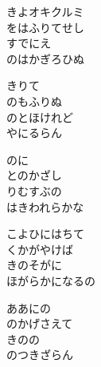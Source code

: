 \documentclass[10pt,b5j]{tarticle} %
\begin{document}
\begin{enumerate}
\begin{minipage}[c]{\blocksize}
        \vspace{\linespace}
        \item
        きよオキクルミ\\
        をはふりてせし\\
        すでにえ\\
        のはかぎろひぬ
        
        \vspace{\linespace}
        \item
        きりて\\
        のもふりぬ\\
        のとほけれど\\
        やにるらん
        
        \vspace{\linespace}
        \item
        のに\\
        とのかざし\\
        りむすぶの\\
        はきわれらかな
        
        \vspace{\linespace}
        \item
        こよひにはちて\\
        くかがやけば\\
        きのそがに\\
        ほがらかになるの
        
        \vspace{\linespace}
        \item
        ああにの\\
        のかげさえて\\
        きのの\\
        のつきざらん
    
    \end{minipage}
\end{enumerate} %
\end{document}
